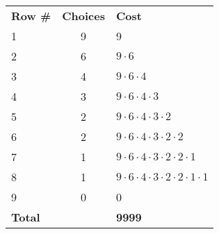 \begin{center}
\begin{tabular}{l | c | l}
	\textbf{Row \#} & \textbf{Choices} & \textbf{Cost} \\
	1 & 9 & 9 \\
	2 & 6 & $9 \cdot 6$ \\
	3 & 4 & $9 \cdot 6 \cdot 4$ \\
	4 & 3 & $9 \cdot 6 \cdot 4 \cdot 3$ \\
	5 & 2 & $9 \cdot 6 \cdot 4 \cdot 3 \cdot 2$ \\
	6 & 2 & $9 \cdot 6 \cdot 4 \cdot 3 \cdot 2 \cdot 2$ \\
	7 & 1 & $9 \cdot 6 \cdot 4 \cdot 3 \cdot 2 \cdot 2 \cdot 1$ \\
	8 & 1 & $9 \cdot 6 \cdot 4 \cdot 3 \cdot 2 \cdot 2 \cdot 1 \cdot 1$ \\
	9 & 0 & 0 \\
	\hline
	\textbf{Total} & & \textbf{9999}
\end{tabular}
\end{center}